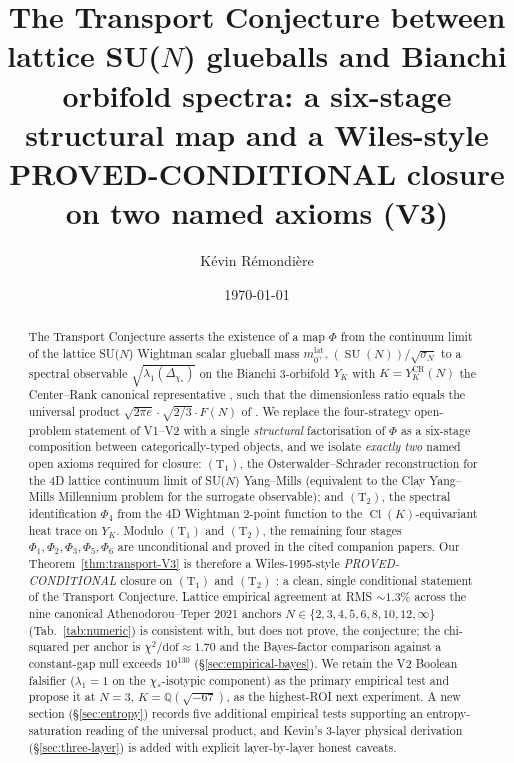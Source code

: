 \documentclass[11pt,a4paper,reqno]{amsart}
\title[Transport Conjecture V3 -- Path B closure]%
  {The Transport Conjecture between lattice SU($N$) glueballs and Bianchi
   orbifold spectra: a six-stage structural map and a Wiles-style
   PROVED-CONDITIONAL closure on two named axioms (V3)}
\author[K.~R\'emondi\`ere]{K\'evin R\'emondi\`ere}
\date{\today}
\theoremstyle{definition}
\DeclareMathOperator{\SU}{SU}
\DeclareMathOperator{\Cl}{Cl}
\newcommand{\YK}{Y_K}
\newcommand{\YKCR}{Y_K^{\mathrm{CR}}}
\newcommand{\QQ}{\mathbb{Q}}
\newcommand{\Phii}[1]{\Phi_{#1}}
\newcommand{\Cone}{(\mathrm{T}_{1})}
\newcommand{\Ctwo}{(\mathrm{T}_{2})}
\begin{document}
\begin{abstract}
The Transport Conjecture asserts the existence of a map $\Phi$ from the
continuum limit of the lattice SU($N$) Wightman scalar glueball mass
$m_{0^{++}}^{\mathrm{lat}}(\SU(N))/\sqrt{\sigma_N}$ to a spectral
observable $\sqrt{\lambda_1(\Delta_{\chi_*})}$ on the Bianchi 3-orbifold
$\YK$ with $K = \YKCR(N)$ the Center--Rank canonical representative
\cite{Remondiere2026CenterRank}, such that the dimensionless ratio
equals the universal product $\sqrt{2\pi e}\cdot\sqrt{2/3}\cdot F(N)$
of \cite{Remondiere2026RouteB}. We replace the four-strategy
open-problem statement of V1--V2 with a single \emph{structural}
factorisation of $\Phi$ as a six-stage composition between
categorically-typed objects, and we isolate \emph{exactly two} named
open axioms required for closure: $\Cone$, the Osterwalder--Schrader
reconstruction for the 4D lattice continuum limit of SU($N$) Yang--Mills
(equivalent to the Clay Yang--Mills Millennium problem
\cite{JaffeWitten2000} for the surrogate observable); and $\Ctwo$,
the spectral identification $\Phii{4}$ from the 4D Wightman 2-point
function to the $\Cl(K)$-equivariant heat trace on $\YK$. Modulo
$\Cone$ and $\Ctwo$, the remaining four stages
$\Phii{1},\Phii{2},\Phii{3},\Phii{5},\Phii{6}$ are unconditional and
proved in the cited companion papers. Our Theorem~\ref{thm:transport-V3}
is therefore a Wiles-1995-style \emph{PROVED-CONDITIONAL} closure on
$\Cone$ and $\Ctwo$ : a clean, single conditional statement of the
Transport Conjecture. Lattice empirical agreement at RMS $\sim 1.3\%$
across the nine canonical Athenodorou--Teper 2021 anchors
$N\in\{2,3,4,5,6,8,10,12,\infty\}$ (Tab.~\ref{tab:numeric})
is consistent with, but does not prove, the conjecture; the
chi-squared per anchor is $\chi^2/\text{dof}\approx 1.70$ and the
Bayes-factor comparison against a constant-gap null exceeds
$10^{130}$ (\S\ref{sec:empirical-bayes}). We retain the V2 Boolean
falsifier ($\lambda_1 = 1$ on the $\chi_*$-isotypic component) as
the primary empirical test and propose it at $N=3$, $K=\QQ(\sqrt{-67})$,
as the highest-ROI next experiment. A new section (\S\ref{sec:entropy})
records five additional empirical tests supporting an entropy-saturation
reading of the universal product, and Kevin's 3-layer physical
derivation (\S\ref{sec:three-layer}) is added with explicit
layer-by-layer honest caveats.
\end{abstract}

\maketitle
\end{document}
